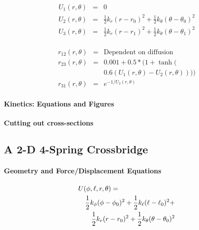 \documentclass[]{article}
\begin{document}
\begin{eqnarray}
\label{2sEnergy}
	U_1(r,\theta) & = & 0 \nonumber \\
    U_2(r,\theta) & = & \frac{1}{2}k_r (r - r_0)^2 + 
                        \frac{1}{2}k_\theta (\theta - \theta_0)^2 \nonumber \\
    U_3(r,\theta) & = & \frac{1}{2}k_r (r - r_1)^2 + 
                        \frac{1}{2}k_\theta (\theta - \theta_1)^2 \\
\end{eqnarray}

\begin{eqnarray}  
\label{2sTransRates}
	r_{12}(r, \theta)   & = & \text{Dependent on diffusion} \nonumber \\
    r_{23}(r, \theta)   & = & 0.001 + 0.5 * (1 + \tanh( \nonumber \\
                        &   & 0.6 (U_1(r, \theta) - U_2(r, \theta)))) \\
	r_{31}(r, \theta)   & = & e^{-1 / U_2(r, \theta)}
\end{eqnarray} 

\paragraph*{Kinetics: Equations and Figures}


\paragraph*{Cutting out cross-sections}



\subsection*{A 2-D 4-Spring Crossbridge}


\paragraph*{Geometry and Force/Displacement Equations}


\begin{eqnarray}
	\lefteqn{U(\phi,\ell,r,\theta) = }  \nonumber \\
 	& & \frac{1}{2}k_\phi (\phi-\phi_0)^2 + \frac{1}{2}k_\ell (\ell-\ell_0)^2 + \nonumber \\
	& & \frac{1}{2}k_r (r-r_0)^2 + \frac{1}{2}k_\theta (\theta-\theta_0)^2
\end{eqnarray}
\end{document}
